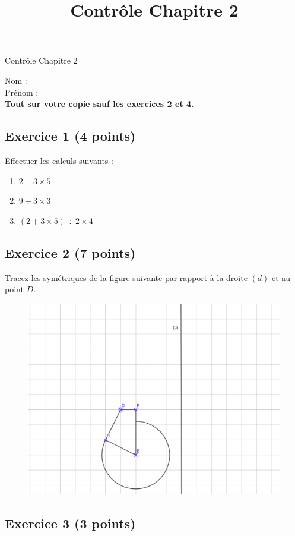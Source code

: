 \documentclass[14 pt]{extarticle}
\title{Contrôle Chapitre 2}
\date{}
\theoremstyle{plain}
\begin{document}
\begin{center}{\Large Contrôle Chapitre 2}\\ 
 \end{center}
 Nom : \\
 Prénom : \\
 
 \textbf{Tout sur votre copie sauf les exercices 2 et 4.}
 \subsection*{Exercice 1 (4 points)}
Effectuer les calculs suivants : 
\begin{enumerate}
\item $2+ 3 \times 5  $
\item $9\div 3 \times 3$ 
\item $ (2+ 3\times5) \div 2\times 4$
\end{enumerate}


 \subsection*{Exercice 2 (7 points)}
 
 Tracez les symétriques de la figure suivante par rapport à la droite $(d)$ et au point $D$. 
 
 \begin{figure}[H]
 \center
 \includegraphics[scale=.55]{Exo1b.png}
 \end{figure}
 
 \subsection*{Exercice 3 (3 points)}
 
\end{document}
